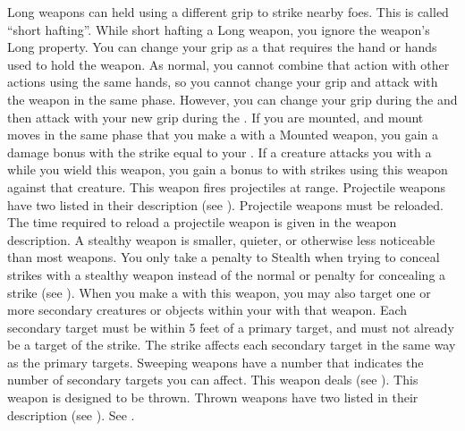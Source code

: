             Long weapons can held using a different grip to strike nearby foes.
            This is called ``short hafting''.
            While short hafting a Long weapon, you ignore the weapon's Long property.
            You can change your grip as a  that requires the hand or hands used to hold the weapon.
            As normal, you cannot combine that action with other actions using the same hands, so you cannot change your grip and attack with the weapon in the same phase.
            However, you can change your grip during the  and then attack with your new grip during the .
            \label{Mounted Weapon} If you are mounted, and mount moves in the same phase that you make a  with a Mounted weapon, you gain a damage bonus with the strike equal to your .
             If a creature attacks you with a  while you wield this weapon, you  gain a  bonus to  with strikes using this weapon against that creature.
             This weapon fires projectiles at range. Projectile weapons have two  listed in their description (see ). Projectile weapons must be reloaded. The time required to reload a projectile weapon is given in the weapon description.
            A stealthy weapon is smaller, quieter, or otherwise less noticeable than most weapons.
            You only take a  penalty to Stealth when trying to conceal strikes with a stealthy weapon instead of the normal  or  penalty for concealing a strike (see ).
            \label{Sweeping} When you make a   with this weapon, you may also target one or more secondary creatures or objects within your  with that weapon.
            Each secondary target must be within 5 feet of a primary target, and must not already be a target of the strike.
            The strike affects each secondary target in the same way as the primary targets.
            Sweeping weapons have a number that indicates the number of secondary targets you can affect.
             This weapon deals  (see ).
             This weapon is designed to be thrown. Thrown weapons have two  listed in their description (see ). See .
